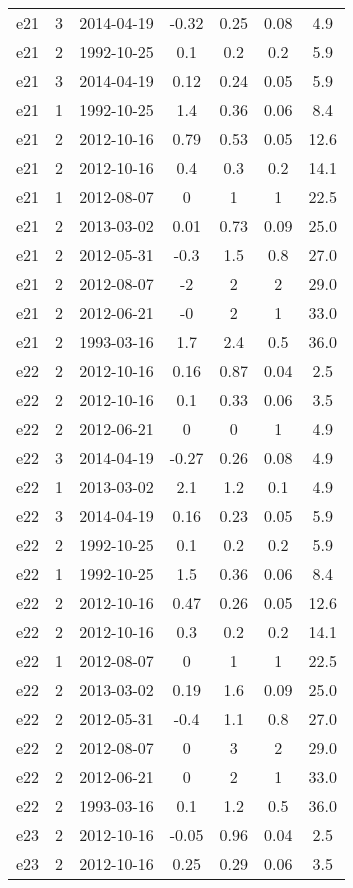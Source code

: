 \begin{table*}[htp]
\begin{tabular}{ccccccc}
e21 & 3 & 2014-04-19 & -0.32 & 0.25 & 0.08 & 4.9 \\
e21 & 2 & 1992-10-25 & 0.1 & 0.2 & 0.2 & 5.9 \\
e21 & 3 & 2014-04-19 & 0.12 & 0.24 & 0.05 & 5.9 \\
e21 & 1 & 1992-10-25 & 1.4 & 0.36 & 0.06 & 8.4 \\
e21 & 2 & 2012-10-16 & 0.79 & 0.53 & 0.05 & 12.6 \\
e21 & 2 & 2012-10-16 & 0.4 & 0.3 & 0.2 & 14.1 \\
e21 & 1 & 2012-08-07 & 0 & 1 & 1 & 22.5 \\
e21 & 2 & 2013-03-02 & 0.01 & 0.73 & 0.09 & 25.0 \\
e21 & 2 & 2012-05-31 & -0.3 & 1.5 & 0.8 & 27.0 \\
e21 & 2 & 2012-08-07 & -2 & 2 & 2 & 29.0 \\
e21 & 2 & 2012-06-21 & -0 & 2 & 1 & 33.0 \\
e21 & 2 & 1993-03-16 & 1.7 & 2.4 & 0.5 & 36.0 \\
e22 & 2 & 2012-10-16 & 0.16 & 0.87 & 0.04 & 2.5 \\
e22 & 2 & 2012-10-16 & 0.1 & 0.33 & 0.06 & 3.5 \\
e22 & 2 & 2012-06-21 & 0 & 0 & 1 & 4.9 \\
e22 & 3 & 2014-04-19 & -0.27 & 0.26 & 0.08 & 4.9 \\
e22 & 1 & 2013-03-02 & 2.1 & 1.2 & 0.1 & 4.9 \\
e22 & 3 & 2014-04-19 & 0.16 & 0.23 & 0.05 & 5.9 \\
e22 & 2 & 1992-10-25 & 0.1 & 0.2 & 0.2 & 5.9 \\
e22 & 1 & 1992-10-25 & 1.5 & 0.36 & 0.06 & 8.4 \\
e22 & 2 & 2012-10-16 & 0.47 & 0.26 & 0.05 & 12.6 \\
e22 & 2 & 2012-10-16 & 0.3 & 0.2 & 0.2 & 14.1 \\
e22 & 1 & 2012-08-07 & 0 & 1 & 1 & 22.5 \\
e22 & 2 & 2013-03-02 & 0.19 & 1.6 & 0.09 & 25.0 \\
e22 & 2 & 2012-05-31 & -0.4 & 1.1 & 0.8 & 27.0 \\
e22 & 2 & 2012-08-07 & 0 & 3 & 2 & 29.0 \\
e22 & 2 & 2012-06-21 & 0 & 2 & 1 & 33.0 \\
e22 & 2 & 1993-03-16 & 0.1 & 1.2 & 0.5 & 36.0 \\
e23 & 2 & 2012-10-16 & -0.05 & 0.96 & 0.04 & 2.5 \\
e23 & 2 & 2012-10-16 & 0.25 & 0.29 & 0.06 & 3.5 \\

\end{tabular}
\end{table*}
